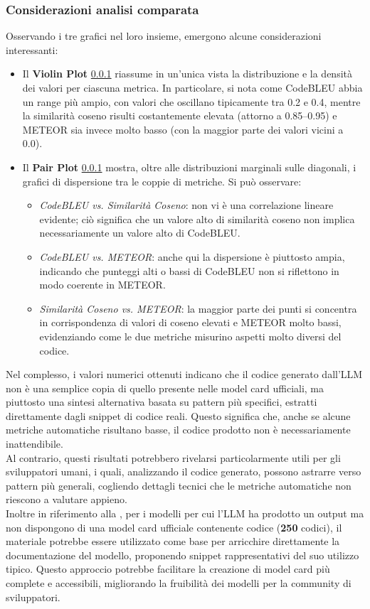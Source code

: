 \documentclass{article}
\begin{document}
\subsubsection{Considerazioni analisi comparata} 
Osservando i tre grafici nel loro insieme, emergono alcune considerazioni interessanti:
\begin{itemize} 
\item Il \textbf{Violin Plot} \ref{} riassume in un’unica vista la distribuzione e la densità dei valori per ciascuna metrica. In particolare, si nota come CodeBLEU abbia un range più ampio, con valori che oscillano tipicamente tra 0.2 e 0.4, mentre la similarità coseno risulti costantemente elevata (attorno a 0.85--0.95) e METEOR sia invece molto basso (con la maggior parte dei valori vicini a 0.0). 
\item Il \textbf{Pair Plot} \ref{} mostra, oltre alle distribuzioni marginali sulle diagonali, i grafici di dispersione tra le coppie di metriche. Si può osservare: 
\begin{itemize} \item \textit{CodeBLEU vs. Similarità Coseno}: non vi è una correlazione lineare evidente; ciò significa che un valore alto di similarità coseno non implica necessariamente un valore alto di CodeBLEU. 
\item \textit{CodeBLEU vs. METEOR}: anche qui la dispersione è piuttosto ampia, indicando che punteggi alti o bassi di CodeBLEU non si riflettono in modo coerente in METEOR. 
\item \textit{Similarità Coseno vs. METEOR}: la maggior parte dei punti si concentra in corrispondenza di valori di coseno elevati e METEOR molto bassi, evidenziando come le due metriche misurino aspetti molto diversi del codice. 
\end{itemize} 
\end{itemize}
Nel complesso, i valori numerici ottenuti indicano che il codice generato dall’LLM non è una semplice copia di quello presente nelle model card ufficiali, ma piuttosto una sintesi alternativa basata su pattern più specifici, estratti direttamente dagli snippet di codice reali. Questo significa che, anche se alcune metriche automatiche risultano basse, il codice prodotto non è necessariamente inattendibile. \\
Al contrario, questi risultati potrebbero rivelarsi particolarmente utili per gli sviluppatori umani, i quali, analizzando il codice generato, possono astrarre verso pattern più generali, cogliendo dettagli tecnici che le metriche automatiche non riescono a valutare appieno.\\
Inoltre in riferimento alla , per i modelli per cui l'LLM ha prodotto un output ma non dispongono di una model card ufficiale contenente codice (\textbf{250} codici), il materiale potrebbe essere utilizzato come base per arricchire direttamente la documentazione del modello, proponendo snippet rappresentativi del suo utilizzo tipico. Questo approccio potrebbe facilitare la creazione di model card più complete e accessibili, migliorando la fruibilità dei modelli per la community di sviluppatori.
\end{document}
